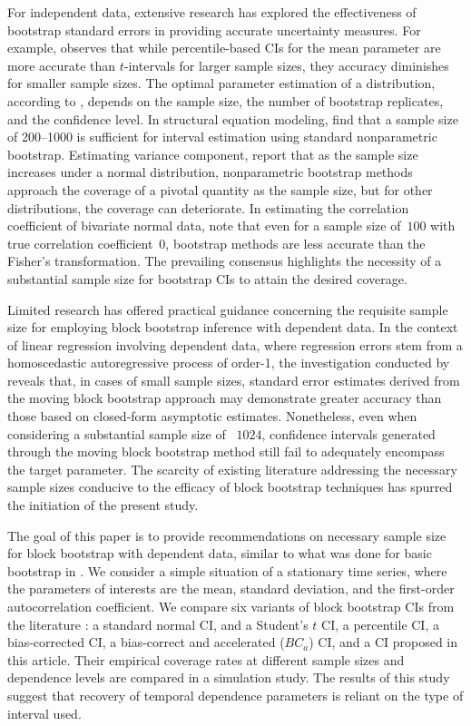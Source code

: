\documentclass[12pt, letterpaper, titlepage]{article}
\begin{document}
For independent data, extensive research has explored the effectiveness of
bootstrap standard errors in providing accurate uncertainty measures.
For example, \citet{hesterberg2015teachers} observes
that while percentile-based CIs for the mean parameter
are more accurate than $t$-intervals for larger sample sizes, they accuracy
diminishes for smaller sample sizes. The optimal parameter estimation of a
distribution, according to \citet{chernick2009revisiting},
depends on the sample size, the number of
bootstrap replicates, and the confidence level. In structural
equation modeling, \citet{nevitt2001performance} find
that a sample size of 200--1000 is sufficient for interval estimation
using standard nonparametric bootstrap. Estimating variance component,
\citet{burch2012nonparametric} report that as the sample size increases under a
normal distribution, nonparametric bootstrap methods approach the coverage of a
pivotal quantity as the sample size, but for other distributions, the coverage
can deteriorate. In estimating the correlation coefficient of bivariate normal
data, \citet{puth2015variety} note that even for a sample size of~$100$ with
true correlation coefficient~0, bootstrap methods are less accurate than the
Fisher's transformation. The prevailing consensus highlights the necessity of a
substantial sample size for bootstrap CIs to attain the desired coverage.


Limited research has offered practical guidance concerning the requisite sample
size for employing block bootstrap inference with dependent data. In the context
of linear regression involving dependent data, where regression errors stem from
a homoscedastic autoregressive process of order-1, the investigation conducted
by \citet{goncalves2005bootstrap} reveals that, in cases of small sample sizes,
standard error estimates derived from the moving block bootstrap approach may
demonstrate greater accuracy than those based on closed-form asymptotic
estimates. Nonetheless, even when considering a substantial sample size of
~$1024$, confidence intervals generated through the moving block bootstrap
method still fail to adequately encompass the target parameter. The scarcity of
existing literature addressing the necessary sample sizes conducive to the
efficacy of block bootstrap techniques has spurred the initiation of the present
study.


The goal of this paper is to provide recommendations on
necessary sample size for block bootstrap with dependent data, similar to what 
was done for basic bootstrap in \citet{hesterberg2015teachers}. We consider a
simple situation of a stationary time series, where the parameters of
interests are the mean, standard deviation, and the first-order
autocorrelation coefficient. We compare six variants of block bootstrap
CIs from the literature \citep{diciccio1996bootstrap,
  rice2006mathematical}: a standard normal CI, and a Student's $t$ CI,
a percentile CI, a bias-corrected CI, a bias-correct and accelerated ($BC_a$)
CI, and a CI proposed in this article. Their
empirical coverage rates at different sample sizes and dependence levels are
compared in a simulation study. The results of this study suggest that recovery
of temporal dependence parameters is reliant
on the type of interval used.
\end{document}
